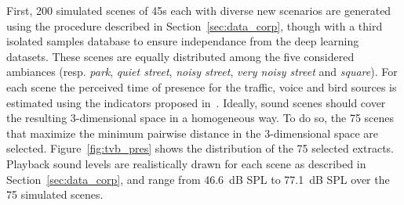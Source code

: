 \documentclass[twocolumn]{article}
\begin{document}
First, 200 simulated scenes of 45s each with diverse new scenarios are generated using the procedure described in Section~\ref{sec:data_corp}, though with a third isolated samples database to ensure independance from the deep learning datasets. These scenes are equally distributed among the five considered ambiances (resp. \textit{park}, \textit{quiet street}, \textit{noisy street}, \textit{very noisy street} and \textit{square}). For each scene the perceived time of presence for the traffic, voice and bird sources is estimated using the indicators proposed in~\cite{gontier2018}. Ideally, sound scenes should cover the resulting 3-dimensional space in a homogeneous way. To do so, the 75 scenes that maximize the minimum pairwise distance in the 3-dimensional space are selected. Figure~\ref{fig:tvb_pres} shows the distribution of the 75 selected extracts. Playback sound levels are realistically drawn for each scene as described in Section~\ref{sec:data_corp}, and range from 46.6~dB SPL to 77.1~dB SPL over the 75 simulated scenes.
\end{document}
